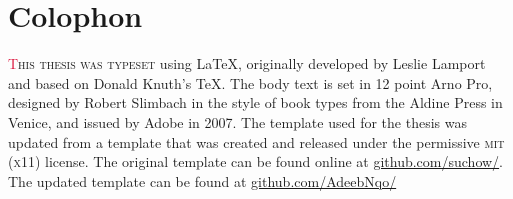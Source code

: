 \chapter*{Colophon}

\begin{center}
\parbox{200pt}{\raggedright\lettrine[lines=3,slope=-2pt,nindent=-4pt]{\textcolor{Crimson}{T}}{his thesis was typeset} using \LaTeX, originally developed by Leslie Lamport and based on Donald Knuth's \TeX. The body text is set in 12 point Arno Pro, designed by Robert Slimbach in the style of book types from the Aldine Press in Venice, and issued by Adobe in 2007. The template used for the thesis was updated from a template that was created and released under the permissive \textsc{mit} (\textsc{x}11) license. The original template can be found online at \href{https://github.com/suchow/}{github.com/suchow/}. The updated template can be found at \href{https://github.com/AdeebNqo/}{github.com/AdeebNqo/}
}
\end{center}